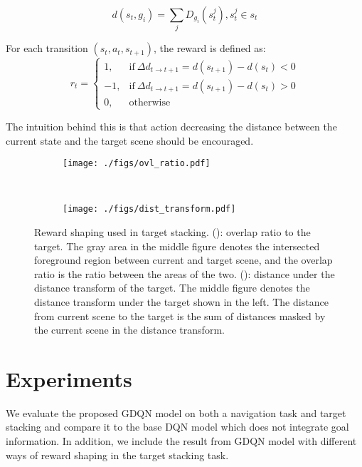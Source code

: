 \documentclass{article} %
\begin{document}
\begin{equation}
d(s_t,g_i) = \sum_j D_{g_i}(s_t^j), s_t^j \in s_t
\end{equation}

For each transition $(s_t, a_t, s_{t+1})$, the reward is defined as: 
\begin{equation}
    r_t =
    \begin{cases}
      1, & \text{if}\ \Delta d_{t\rightarrow t+1} = d(s_{t+1}) - d(s_t) <  0 \\
      -1, & \text{if}\ \Delta d_{t\rightarrow t+1} = d(s_{t+1}) - d(s_t) >  0\\
      0, & \text{otherwise}
    \end{cases}
\end{equation}

The intuition behind this is that action decreasing the distance between the current state and the target scene should be encouraged.

\begin{figure}
\centering
\begin{subfigure}{0.47\linewidth}
\texttt{[image: ./figs/ovl\_ratio.pdf]}
\caption{}
\label{fig:overlap_ratio}
\end{subfigure}
~
\begin{subfigure}{0.47\linewidth}
\texttt{[image: ./figs/dist\_transform.pdf]}
\caption{}
\label{fig:dist_transform}
\end{subfigure}
\caption{Reward shaping used in target stacking. (\protect{}): overlap ratio to the target. The gray area in the middle figure denotes the intersected foreground region between current and target scene, and the overlap ratio is the ratio between the areas of the two. (\protect{}): distance under the distance transform of the target. The middle figure denotes the distance transform under the target shown in the left. The distance from current scene to the target is the sum of distances masked by the current scene in the distance transform.}
\label{fig:reward_shape}
\end{figure}
\section{Experiments}
We evaluate the proposed GDQN model on both a navigation task and target stacking and compare it to the base DQN model which does not integrate goal information. In addition, we include the result from GDQN model with different ways of reward shaping in the target stacking task.
\end{document}

